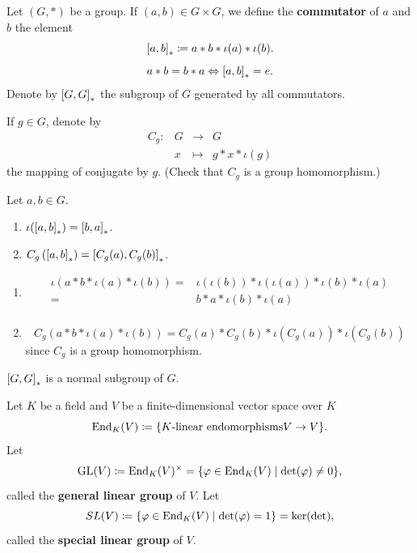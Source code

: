 \begin{definitionenv}
    Let $(G,*)$ be a group.
    If $(a,b) \in G \times G$, we define the \textbf{commutator} of $a$ and $b$ the element
    $$\left[a, b\right]_{*}\coloneq a * b * \iota (a) * \iota(b).$$
    $$a * b = b * a \Leftrightarrow \left[a, b\right]_{*} = e.$$
    Denote by $\left[G, G\right]_{*}$ the subgroup of $G$ generated by all commutators.

    \quad If $g \in G$, denote by
    $$\begin{array}{rrcl}
        C_{g} : & G & \longrightarrow & G\\
        & x & \longmapsto & g * x * \iota(g)
    \end{array}$$
    the mapping of conjugate by $g$.
    (Check that $C_g$ is a group homomorphism.)
\end{definitionenv}

\begin{propositionenv}
    Let $a,b \in G$.
    \begin{enumerate}[label=(\arabic*)]
        \item $\iota(\left[a, b\right]_{*}) = \left[b, a\right]_{*}$.
        \item $C_g\left(\left[a, b\right]_{*}\right) = \left[C_g(a), C_g(b)\right]_{*}$.
    \end{enumerate}
\end{propositionenv}
\begin{proofenv}
    \quad
    \begin{enumerate}[label=(\arabic*)]
        \item $$\begin{aligned}
            \iota(a * b * \iota(a) * \iota(b)) = & \iota(\iota (b)) * \iota(\iota(a)) * \iota(b) * \iota(a)\\
            = & b * a * \iota(b) * \iota(a)\\
        \end{aligned}$$
        \item $$C_g(a * b * \iota(a) * \iota(b)) = C_g(a) * C_g(b) * \iota(C_g(a)) * \iota(C_g(b))$$
            since $C_{g}$ is a group homomorphism.

    \end{enumerate}
\end{proofenv}

\begin{corollaryenv}
    $\left[G, G\right]_{*}$ is a normal subgroup of $G$.
\end{corollaryenv}

\begin{definitionenv}
    Let $K$ be a field and $V$ be a finite-dimensional vector space over $K$
    $$\operatorname{\mathrm{End}}_{K}(V) \coloneq \{K\text{-linear endomorphisms} V \rightarrow V\}.$$
    Let
    $$\operatorname{\mathrm{GL}}(V) \coloneq \operatorname{\mathrm{End}}_{K}(V)^\times = \{\varphi \in \operatorname{\mathrm{End}}_{K}(V) \mid \det (\varphi) \neq 0\},$$
    called the \textbf{general linear group} of $V$.
    Let
    $$SL(V) \coloneq \{\varphi \in \operatorname{\mathrm{End}}_{K}(V) \mid \det (\varphi) = 1\} = \ker (\det),$$
    called the \textbf{special linear group} of $V$.
\end{definitionenv}

